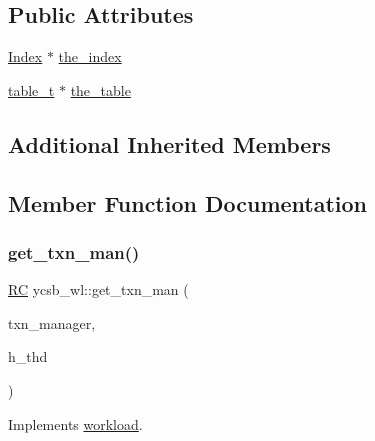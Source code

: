 \subsection*{Public Attributes}
\begin{DoxyCompactItemize}
\item 
\hyperlink{classIndex}{Index} $\ast$ \hyperlink{classycsb__wl_adc52d421067b72cff7d5ef56dd612202}{the\+\_\+index}
\item 
\hyperlink{classtable__t}{table\+\_\+t} $\ast$ \hyperlink{classycsb__wl_a717e1db064d7069663e031231984c18e}{the\+\_\+table}
\end{DoxyCompactItemize}
\subsection*{Additional Inherited Members}


\subsection{Member Function Documentation}
\mbox{\label{classycsb__wl_a31fb01819cd6a3517259ec9bb80066ca}} 
\subsubsection{\texorpdfstring{get\+\_\+txn\+\_\+man()}{get\_txn\_man()}}
{\footnotesize\ttfamily \hyperlink{global_8h_a78c49a674c810fdd03d20432f7be864a}{RC} ycsb\+\_\+wl\+::get\+\_\+txn\+\_\+man (\begin{DoxyParamCaption}\item[{\hyperlink{classtxn__man}{txn\+\_\+man} $\ast$\&}]{txn\+\_\+manager,  }\item[{\hyperlink{classthread__t}{thread\+\_\+t} $\ast$}]{h\+\_\+thd }\end{DoxyParamCaption})\hspace{0.3cm}{\ttfamily [virtual]}}



Implements \hyperlink{classworkload_ac22d0558c3fc549b8b07347cebb95cb3}{workload}.

\mbox{\label{classycsb__wl_ab457878c0f802cbbbf9ff27979e0eda6}} 
